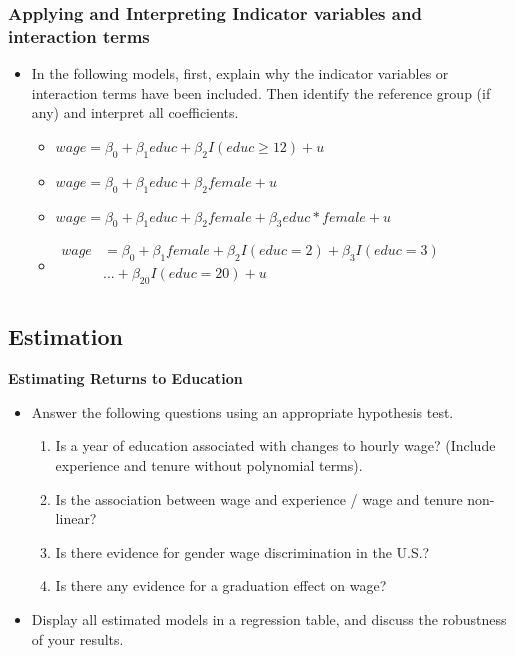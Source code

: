 \documentclass[
]{book}
\providecommand{\tightlist}{%
  \setlength{\itemsep}{0pt}\setlength{\parskip}{0pt}}
\theoremstyle{definition}
\theoremstyle{definition}
\theoremstyle{definition}
\theoremstyle{definition}
\theoremstyle{remark}
\begin{document}
\hypertarget{applying-and-interpreting-indicator-variables-and-interaction-terms}{%
\subsubsection{Applying and Interpreting Indicator variables and interaction terms}\label{applying-and-interpreting-indicator-variables-and-interaction-terms}}

\begin{itemize}
\item
  In the following models, first, explain why the indicator variables or interaction terms have been included. Then identify the reference group (if any) and interpret all coefficients.

  \begin{itemize}
  \item
    \(wage = \beta_0 + \beta_1 educ + \beta_2 I(educ \geq 12) + u\)
  \item
    \(wage = \beta_0 + \beta_1 educ + \beta_2 female + u\)
  \item
    \(wage = \beta_0 + \beta_1 educ + \beta_2 female + \beta_3 educ*female + u\)
  \item
    \(\begin{aligned} wage &= \beta_0 + \beta_1 female + \beta_2 I(educ = 2) + \beta_3 I(educ = 3)\\ &...+ \beta_{20} I(educ = 20) + u\\ \end{aligned}\)
  \end{itemize}
\end{itemize}

\hypertarget{estimation}{%
\subsection{Estimation}\label{estimation}}

\textbf{Estimating Returns to Education}

\begin{itemize}
\tightlist
\item
  Answer the following questions using an appropriate hypothesis test.

  \begin{enumerate}
  \def\labelenumi{\arabic{enumi}.}
  \tightlist
  \item
    Is a year of education associated with changes to hourly wage? (Include experience and tenure without polynomial terms).
  \item
    Is the association between wage and experience / wage and tenure non-linear?
  \item
    Is there evidence for gender wage discrimination in the U.S.?
  \item
    Is there any evidence for a graduation effect on wage?
  \end{enumerate}
\item
  Display all estimated models in a regression table, and discuss the robustness of your results.
\end{itemize}
\end{document}
